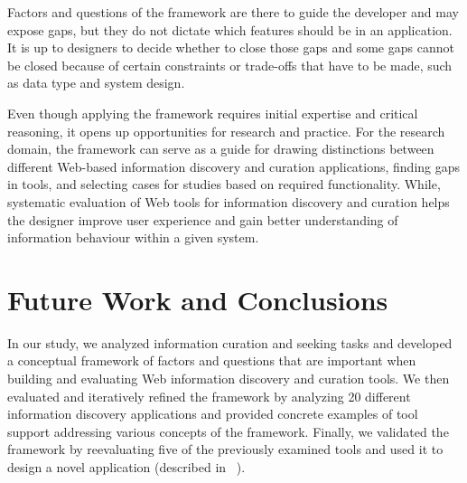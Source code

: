 \documentclass[review]{elsarticle}
\begin{document}
{Factors and questions of the framework are there to guide the developer and may expose gaps, but they do not dictate which features should be in an application. It is up to designers to decide whether to close those gaps and some gaps cannot be closed because of certain constraints or trade-offs that have to be made, such as data type and system design.


Even though applying the framework requires initial expertise and critical reasoning, it opens up opportunities for research and practice. 
For the research domain, the framework can serve as a guide for drawing distinctions between different Web-based information discovery and curation applications, finding gaps in tools, and selecting cases for studies based on required functionality. 
While, systematic evaluation of Web tools for information discovery and curation helps the designer improve user experience and gain better understanding of information behaviour within a given system. 

\section{Future Work and Conclusions}
\label{section:future_work}
In our study, we analyzed information curation and seeking tasks and developed a conceptual framework of factors and questions that are important when building and evaluating Web information discovery and curation tools. We then evaluated and iteratively refined the framework by analyzing 20 different information discovery applications and provided concrete examples of tool support addressing various concepts of the framework. Finally, we validated the framework by reevaluating five of the previously examined tools and used it to design a novel application (described in ~\cite{voyloshnikova2015}). 

}
\end{document}
